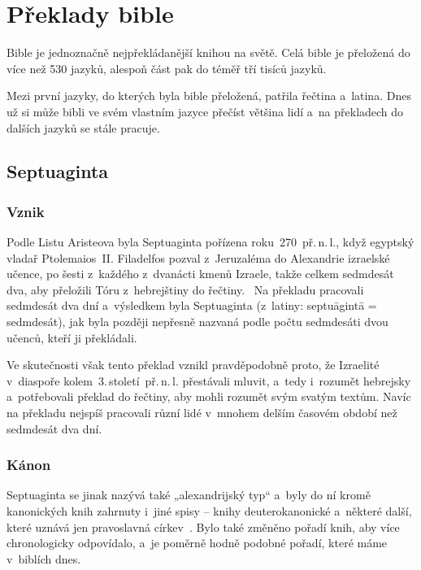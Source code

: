 \documentclass[a4paper,11pt,oneside]{article}
\begin{document}
\section{Překlady bible}

Bible je jednoznačně nejpřekládanější knihou na světě. Celá bible je přeložená do více než 530 jazyků, alespoň část pak do téměř tří tisíců jazyků.~\cite{wycliffe}

Mezi první jazyky, do kterých byla bible přeložená, patřila řečtina a~latina. Dnes už si může bibli ve svém vlastním jazyce přečíst většina lidí a~na překladech do dalších jazyků se stále pracuje.

\subsection{Septuaginta}

\subsubsection{Vznik}
Podle Listu Aristeova byla Septuaginta pořízena roku~270~př.\,n.\,l., když egyptský vladař Ptolemaios~II. Filadelfos pozval z~Jeruzaléma do Alexandrie izraelské učence, po šesti z~každého z~dvanácti kmenů Izraele, takže celkem sedmdesát dva, aby přeložili Tóru z~hebrejštiny do řečtiny.~\cite{LXX}  Na překladu pracovali sedmdesát dva dní a~výsledkem byla Septuaginta (z~latiny: septuāgintā = sedmdesát), jak byla později nepřesně nazvaná podle počtu sedmdesáti dvou učenců, kteří ji překládali.

Ve skutečnosti však tento překlad vznikl pravděpodobně proto, že Izraelité v~diaspoře kolem~3.\,století~př.\,n.\,l. přestávali mluvit, a~tedy i~rozumět hebrejsky a~potřebovali překlad do řečtiny, aby mohli rozumět svým svatým textům. Navíc na překladu nejspíš pracovali různí lidé v~mnohem delším časovém období než sedmdesát dva dní.

\subsubsection{Kánon}
Septuaginta se jinak nazývá také „alexandrijský typ“ a~byly do ní kromě kanonických knih zahrnuty i~jiné spisy – knihy deuterokanonické a~některé další, které uznává jen pravoslavná církev~\cite{kanon}. Bylo také změněno pořadí knih, aby více chronologicky odpovídalo, a~je poměrně hodně podobné pořadí, které máme v~biblích dnes.
\end{document}
